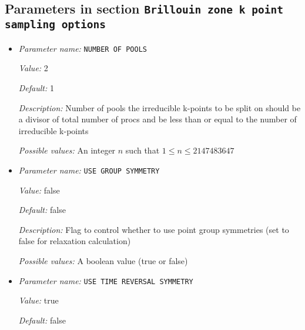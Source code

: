 \subsection{Parameters in section \tt Brillouin zone k point sampling options}
\label{parameters:Brillouin_20zone_20k_20point_20sampling_20options}

\begin{itemize}
\item {\it Parameter name:} {\tt NUMBER OF POOLS}
\label{parameters:Brillouin zone k point sampling options/NUMBER OF POOLS}
\label{parameters:Brillouin_20zone_20k_20point_20sampling_20options/NUMBER_20OF_20POOLS}


{\it Value:} 2


{\it Default:} 1


{\it Description:} Number of pools the irreducible k-points to be split on should be a divisor of total number of procs and be less than or equal to the number of irreducible k-points


{\it Possible values:} An integer $n$ such that $1\leq n \leq 2147483647$
\item {\it Parameter name:} {\tt USE GROUP SYMMETRY}
\label{parameters:Brillouin zone k point sampling options/USE GROUP SYMMETRY}
\label{parameters:Brillouin_20zone_20k_20point_20sampling_20options/USE_20GROUP_20SYMMETRY}


{\it Value:} false


{\it Default:} false


{\it Description:} Flag to control whether to use point group symmetries (set to false for relaxation calculation)


{\it Possible values:} A boolean value (true or false)
\item {\it Parameter name:} {\tt USE TIME REVERSAL SYMMETRY}
\label{parameters:Brillouin zone k point sampling options/USE TIME REVERSAL SYMMETRY}
\label{parameters:Brillouin_20zone_20k_20point_20sampling_20options/USE_20TIME_20REVERSAL_20SYMMETRY}


{\it Value:} true


{\it Default:} false



\end{itemize}
